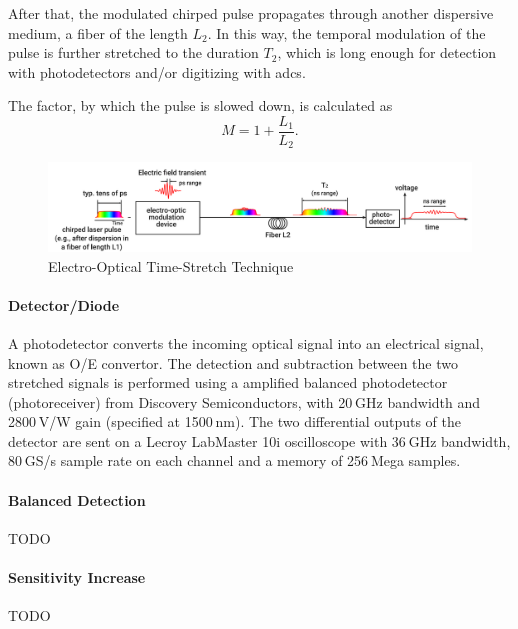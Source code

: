 After that, the modulated chirped pulse propagates through another dispersive medium, a fiber of the length $L_2$.
In this way, the temporal modulation of the pulse is further stretched to the duration $T_2$, which is long enough for detection with photodetectors and/or digitizing with \Glspl{adc}. \cite{roussel2014}

The factor, by which the pulse is slowed down, is calculated as
\begin{equation}
	M = 1 + \frac{L_1}{L_2}.
\end{equation}

\begin{figure}[tbh]
	\centering
	\includegraphics[width = \textwidth]{chap/02-theory/img/time_stretch.png}
	\caption{Electro-Optical Time-Stretch Technique \cite{szwaj}}
	\label{fig:eo_ts}
\end{figure}


\paragraph{Detector/Diode}
A photodetector converts the incoming optical signal into an electrical signal, known as O/E convertor.
The detection and subtraction between the two stretched signals is performed using a amplified balanced photodetector (photoreceiver) from Discovery Semiconductors, with 20 GHz bandwidth and 2800 V/W gain (specified at 1500 nm). The two differential outputs of the detector are sent on a Lecroy LabMaster 10i oscilloscope with 36 GHz bandwidth, 80 GS/s sample rate on each channel and a memory of 256 Mega samples.

\paragraph{Balanced Detection}
TODO
\paragraph{Sensitivity Increase}
TODO
